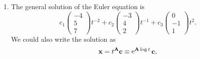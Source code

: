 {\begin{Solution}
\begin{enumerate}
    The matrix exponential, $\e^{\mathbf{A} t}$ is given by
    \[
    \e^{\mathbf{A}} = \mathbf{S} \e^{\mathbf{J}} \mathbf{S}^{-1}.
    \]
    \[
    \e^{\mathbf{A}} = 
    \begin{pmatrix}
      -4 & -3 & 0 \\
      5 & 4 & -1 \\
      7 & 2 & 1
    \end{pmatrix}
    \begin{pmatrix}
      \e^{-2 t} & 0 & 0 \\
      0 & \e^{-t} & 0 \\
      0 & 0 & \e^{2 t}
    \end{pmatrix}
    \frac{1}{12}
    \begin{pmatrix}
      6 & 3 & 3 \\
      -12 & -4 & -4 \\
      -18 & -13 & -1
    \end{pmatrix}.
    \]
    \[
    \boxed{
      \e^{\mathbf{A} t} = 
      \begin{pmatrix}
        -2 \e^{-2 t} + 3 \e^{-t} &
        -\e^{-2 t} + \e^{-t} &
        -\e^{-2 t} + \e^{-t} \\
        \frac{ 5 \e^{-2 t} - 8 \e^{-t} + 3 \e^t }{ 2 } &
        \frac{ 15 \e^{-2 t} - 16 \e^{-t} + 13 \e^t }{ 12 } &
        \frac{ 15 \e^{-2 t} - 16 \e^{-t} + \e^t }{ 12 } \\
        \frac{ 7 \e^{-2 t} - 4 \e^{-t} - 3 \e^t }{ 2 } &
        \frac{ 21 \e^{-2 t} - 8 \e^{-t} - 13 \e^t }{ 12 } &
        \frac{ 21 \e^{-2 t} - 8 \e^{-t} - \e^t }{ 12 } 
      \end{pmatrix}
      }
    \]
    The solution of the initial value problem is $\e^{\mathbf{A} t} \mathbf{x}_0$.
  \item
    The general solution of the Euler equation is
    \[
    \boxed{
      c_1 \begin{pmatrix}
        -4 \\
        5 \\
        7
      \end{pmatrix} t^{-2} + 
      c_2 \begin{pmatrix}
        -3 \\
        4 \\
        2
      \end{pmatrix} t^{-1} +
      c_3 \begin{pmatrix}
        0 \\
        -1 \\
        1
      \end{pmatrix} t^2.
      }
    \]
    We could also write the solution as 
    \[
    \mathbf{x} = t^{\mathbf{A}} \mathbf{c} \equiv \mathop{\mathrm{e}}\nolimits^{\mathbf{A} \log t} \mathbf{c},
    \]
  \end{enumerate}
\end{Solution}










}
